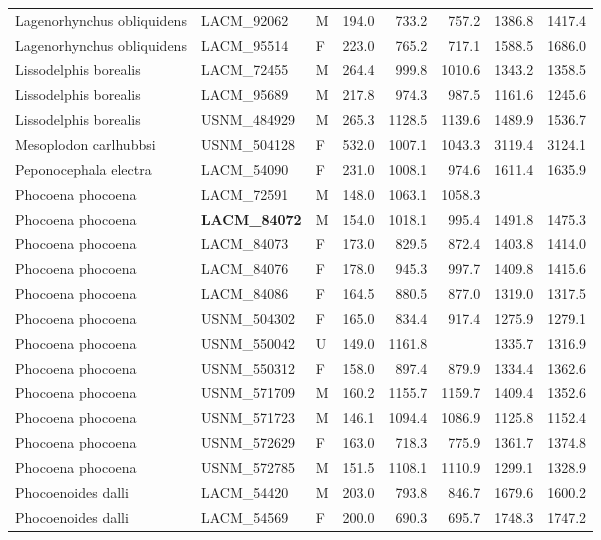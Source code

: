 \begin{table}[ht]
\begin{tabular}{lllrrrrr}
  Lagenorhynchus obliquidens & LACM\_92062 & M & 194.0 & 733.2 & 757.2 & 1386.8 & 1417.4 \\ 
  Lagenorhynchus obliquidens & LACM\_95514 & F & 223.0 & 765.2 & 717.1 & 1588.5 & 1686.0 \\ 
  Lissodelphis borealis & LACM\_72455 & M & 264.4 & 999.8 & 1010.6 & 1343.2 & 1358.5 \\ 
  Lissodelphis borealis & LACM\_95689 & M & 217.8 & 974.3 & 987.5 & 1161.6 & 1245.6 \\ 
  Lissodelphis borealis & USNM\_484929 & M & 265.3 & 1128.5 & 1139.6 & 1489.9 & 1536.7 \\ 
  Mesoplodon carlhubbsi & USNM\_504128 & F & 532.0 & 1007.1 & 1043.3 & 3119.4 & 3124.1 \\ 
  Peponocephala electra & LACM\_54090 & F & 231.0 & 1008.1 & 974.6 & 1611.4 & 1635.9 \\ 
  Phocoena phocoena & LACM\_72591 & M & 148.0 & 1063.1 & 1058.3 &  &  \\ 
  Phocoena phocoena & \textbf{ LACM\_84072 } & M & 154.0 & 1018.1 & 995.4 & 1491.8 & 1475.3 \\ 
  Phocoena phocoena & LACM\_84073 & F & 173.0 & 829.5 & 872.4 & 1403.8 & 1414.0 \\ 
  Phocoena phocoena & LACM\_84076 & F & 178.0 & 945.3 & 997.7 & 1409.8 & 1415.6 \\ 
  Phocoena phocoena & LACM\_84086 & F & 164.5 & 880.5 & 877.0 & 1319.0 & 1317.5 \\ 
  Phocoena phocoena & USNM\_504302 & F & 165.0 & 834.4 & 917.4 & 1275.9 & 1279.1 \\ 
  Phocoena phocoena & USNM\_550042 & U & 149.0 & 1161.8 &  & 1335.7 & 1316.9 \\ 
  Phocoena phocoena & USNM\_550312 & F & 158.0 & 897.4 & 879.9 & 1334.4 & 1362.6 \\ 
  Phocoena phocoena & USNM\_571709 & M & 160.2 & 1155.7 & 1159.7 & 1409.4 & 1352.6 \\ 
  Phocoena phocoena & USNM\_571723 & M & 146.1 & 1094.4 & 1086.9 & 1125.8 & 1152.4 \\ 
  Phocoena phocoena & USNM\_572629 & F & 163.0 & 718.3 & 775.9 & 1361.7 & 1374.8 \\ 
  Phocoena phocoena & USNM\_572785 & M & 151.5 & 1108.1 & 1110.9 & 1299.1 & 1328.9 \\ 
  Phocoenoides dalli & LACM\_54420 & M & 203.0 & 793.8 & 846.7 & 1679.6 & 1600.2 \\ 
  Phocoenoides dalli & LACM\_54569 & F & 200.0 & 690.3 & 695.7 & 1748.3 & 1747.2 \\ 

\end{tabular}
\end{table}
